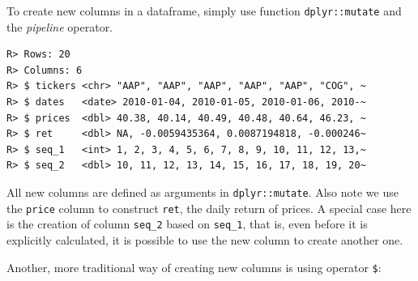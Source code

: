 \documentclass[
  12pt,
]{book}
\newenvironment{Shaded}{\begin{snugshade}}{\end{snugshade}}
\newcommand{\CommentTok}[1]{\textcolor[rgb]{0.37,0.37,0.37}{\textit{#1}}}
\newcommand{\DataTypeTok}[1]{\textcolor[rgb]{0.27,0.27,0.27}{#1}}
\newcommand{\DecValTok}[1]{\textcolor[rgb]{0.06,0.06,0.06}{#1}}
\newcommand{\KeywordTok}[1]{\textcolor[rgb]{0.27,0.27,0.27}{\textbf{#1}}}
\newcommand{\NormalTok}[1]{#1}
\newcommand{\OperatorTok}[1]{\textcolor[rgb]{0.43,0.43,0.43}{\textbf{#1}}}
\newcommand{\StringTok}[1]{\textcolor[rgb]{0.5,0.5,0.5}{#1}}
\begin{document}
To create new columns in a dataframe, simply use function \texttt{dplyr::mutate} and the \emph{pipeline} operator.  

\begin{Shaded}
\end{Shaded}

\begin{verbatim}
R> Rows: 20
R> Columns: 6
R> $ tickers <chr> "AAP", "AAP", "AAP", "AAP", "AAP", "COG", ~
R> $ dates   <date> 2010-01-04, 2010-01-05, 2010-01-06, 2010-~
R> $ prices  <dbl> 40.38, 40.14, 40.49, 40.48, 40.64, 46.23, ~
R> $ ret     <dbl> NA, -0.0059435364, 0.0087194818, -0.000246~
R> $ seq_1   <int> 1, 2, 3, 4, 5, 6, 7, 8, 9, 10, 11, 12, 13,~
R> $ seq_2   <dbl> 10, 11, 12, 13, 14, 15, 16, 17, 18, 19, 20~
\end{verbatim}

All new columns are defined as arguments in \texttt{dplyr::mutate}. Also note we use the \texttt{price} column to construct \texttt{ret}, the daily return of prices. A special case here is the creation of column \texttt{seq\_2} based on \texttt{seq\_1}, that is, even before it is explicitly calculated, it is possible to use the new column to create another one.

Another, more traditional way of creating new columns is using operator \texttt{\$}:

\begin{Shaded}
\end{Shaded}
\end{document}
